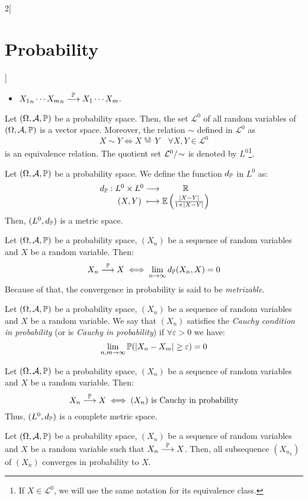 \documentclass[../../../main.tex]{subfiles}
\begin{document}
\begin{multicols}{2}[\section{Probability}]
\begin{corollary}
\begin{itemize}
      \item ${X_1}_n\cdots{X_m}_n\overset{\mathbb{P}}{\longrightarrow}X_1\cdots X_m$.
    \end{itemize}
  \end{corollary}
  \begin{lemma}
    Let $(\Omega,\mathcal{A},\mathbb{P})$ be a probability space. Then, the set $\mathcal{L}^0$ of all random variables of $(\Omega,\mathcal{A},\mathbb{P})$ is a vector space. Moreover, the relation $\sim$ defined in $\mathcal{L}^0$ as $$X\sim Y\iff X\overset{\text{a.s.}}{=} Y\quad\forall X,Y\in\mathcal{L}^0$$ is an equivalence relation. The quotient set $\quot{\mathcal{L}^0}{\!\sim}$ is denoted by $L^0$\footnote{If $X\in\mathcal{L}^0$, we will use the same notation for its equivalence class.}.
  \end{lemma}
  \begin{proposition}
    Let $(\Omega,\mathcal{A},\mathbb{P})$ be a probability space. We define the function $d_{\mathbb{P}}$ in $L^0$ as:
    $$\function{d_\Prob}{L^0\times L^0}{\RR}{(X,Y)}{\Exp\left(\frac{|X-Y|}{1+|X-Y|}\right)}$$
    Then, $(L^0,d_{\mathbb{P}})$ is a metric space.
  \end{proposition}
  \begin{proposition}
    Let $(\Omega,\mathcal{A},\mathbb{P})$ be a probability space, $(X_n)$ be a sequence of random variables and $X$ be a random variable. Then:
    $$X_n\overset{\mathbb{P}}{\longrightarrow} X\iff\lim_{n\to\infty} d_{\mathbb{P}}(X_n,X)=0$$
    Because of that, the convergence in probability is said to be \emph{metrizable}.
  \end{proposition}
  \begin{definition}
    Let $(\Omega,\mathcal{A},\mathbb{P})$ be a probability space, $(X_n)$ be a sequence of random variables and $X$ be a random variable. We say that $(X_n)$ satisfies the \emph{Cauchy condition in probability} (or is \emph{Cauchy in probability}) if $\forall \varepsilon >0$ we have: $$\lim_{n,m\to\infty}\mathbb{P}(|X_n-X_m|\geq \varepsilon)=0$$
  \end{definition}
  \begin{proposition}
    Let $(\Omega,\mathcal{A},\mathbb{P})$ be a probability space, $(X_n)$ be a sequence of random variables and $X$ be a random variable. Then:
    $$X_n\overset{\mathbb{P}}{\longrightarrow} X\iff(X_n)\text{ is Cauchy in probability}$$
    Thus, $(L^0,d_{\mathbb{P}})$ is a complete metric space.
  \end{proposition}
  \begin{proposition}
    Let $(\Omega,\mathcal{A},\mathbb{P})$ be a probability space, $(X_n)$ be a sequence of random variables and $X$ be a random variable such that $X_n\overset{\mathbb{P}}{\longrightarrow} X$. Then, all subsequence $(X_{n_k})$ of $(X_n)$ converges in probability to $X$.
  \end{proposition}

\end{multicols}
\end{document}
